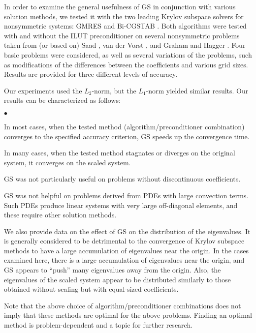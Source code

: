 \documentclass[12pt,a4paper]{article}
\renewenvironment{itemize}
{
\begin{list}
{$\bullet$}
{
\setlength{\leftmargin}{25pt}
\setlength{\rightmargin}{0pt}
\setlength{\parsep}{0pt}
\setlength{\itemsep}{0pt}
\setlength{\topsep}{\parskip}
\setlength{\parskip}{0pt}
\setlength{\baselineskip}{14pt}
\setlength{\labelsep}{3pt}
}
}
{\end{list}}
\newcounter{i}
\def\bi{\begin{itemize}}
\def\ei{\end{itemize}}
\begin{document}
In order to examine the general usefulness of GS in conjunction with
various solution methods, we tested it with the two leading Krylov 
subspace solvers for nonsymmetric systems: GMRES \cite{Saad86} and 
Bi-CGSTAB \cite{Vorst92}.  Both algorithms were tested with and 
without the ILUT preconditioner \cite{Saad94} on several nonsymmetric 
problems taken from (or based on) Saad \cite{Saad03}, van der Vorst
\cite{Vorst92}, and Graham and Hagger \cite{Graham99}.  Four basic 
problems were considered, as well as several variations of the 
problems, such as modifications of the differences between the 
coefficients and various grid sizes.  Results are provided for 
three different levels of accuracy.  

Our experiments used the $L_2$-norm, but the $L_1$-norm yielded
similar results.  Our results can be characterized as follows:
\bi
\item In most cases, when the tested method (algorithm/preconditioner
combination) converges to the specified accuracy criterion, GS speeds
up the convergence time.
\item In many cases, when the tested method stagnates or diverges
on the original system, it converges on the scaled system.
\item GS was not particularly useful on problems without discontinuous
coefficients.
\item GS was not helpful on problems derived from PDEs with large
convection terms.  Such PDEs produce linear systems with very large
off-diagonal elements, and these require other solution methods.
\ei

We also provide data on the effect of GS on the distribution of the 
eigenvalues.  It is generally considered to be detrimental to the
convergence of Krylov subspace methods to have a large accumulation
of eigenvalues near the origin.
In the cases examined here, there is a large accumulation of 
eigenvalues near the origin, and GS appears to ``push'' many 
eigenvalues away from the origin.  Also, the eigenvalues of 
the scaled system appear to be distributed similarly to those 
obtained without scaling but with equal-sized coefficients.  

Note that the above choice of algorithm/preconditioner combinations 
does not imply that these methods are optimal for the above problems. 
Finding an optimal method is problem-dependent and a topic for
further research.
\end{document}

